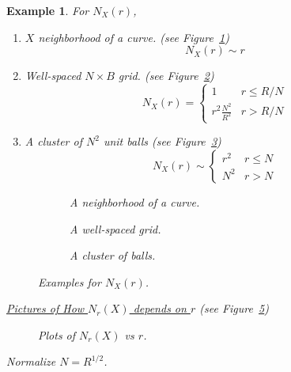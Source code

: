 \documentclass[12pt]{amsart}
\newtheorem{Example}[theorem]{Example}
\begin{document}
\begin{Example}
    For $N_X(r)$,
    \begin{enumerate}
        \item $X$ neighborhood of a curve. (see Figure~\ref{fig:neighborhoodofcurve})
        $$N_X(r) \sim r$$
        \item Well-spaced $N \times B$ grid. (see Figure~\ref{fig:wellspacedgrid})
        $$N_X(r)=\begin{cases}
            1  & r \leq R/N \\
            r^2\frac{N^2}{R^2} & r> R/N
        \end{cases}$$ 
        \item A cluster of $N^2$ unit balls (see Figure~\ref{fig:clusteredballs})
        $$N_X(r)\sim \begin{cases}
            r^2 & r \leq N\\
            N^2 & r>N
        \end{cases}$$
    \end{enumerate}
    \begin{figure}[h!]
        \centering
        \begin{subfigure}[t]{0.3\textwidth}
            \centering
            \caption{A neighborhood of a curve.}
            \label{fig:neighborhoodofcurve}
        \end{subfigure}
        \hfill
        \begin{subfigure}[t]{0.3\textwidth}
            \centering
            \caption{A well-spaced grid.}
            \label{fig:wellspacedgrid}
        \end{subfigure}
        \hfill
        \begin{subfigure}[t]{0.3\textwidth}
            \centering
            \caption{A cluster of balls.}
            \label{fig:clusteredballs}
        \end{subfigure}
        \caption{Examples for $N_X(r)$.}
        \label{fig:nxr_examples}
    \end{figure}
    \underline{Pictures of How $N_r(X)$ depends on $r$} (see Figure~\ref{fig:nrxplots})\\
\begin{figure}[h]
    \centering
    
    \caption{Plots of $N_r(X)$ vs $r$.}
    \label{fig:nrxplots}
\end{figure}
    Normalize $N=R^{1/2}$. 

\end{Example}
\end{document}
